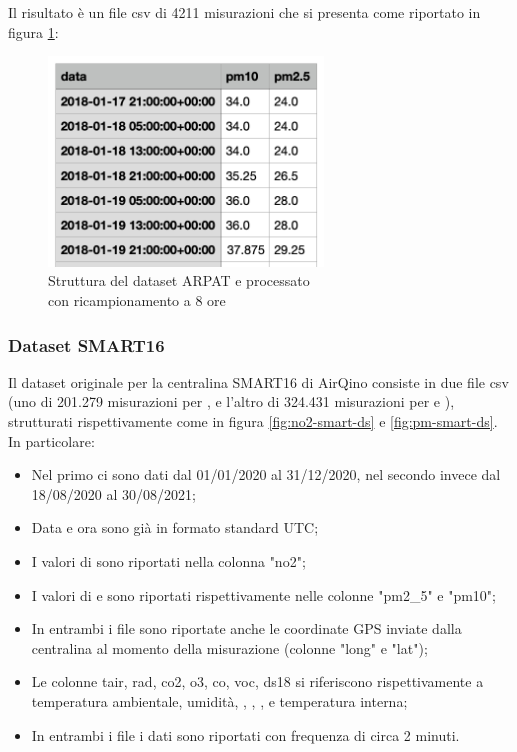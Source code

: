 Il risultato è un file csv di 4211 misurazioni che si presenta come riportato in figura \ref{fig:ds-arpat-pm-dopo}:

\begin{figure}[H]
\centering
\captionsetup{justification=centering}
\includegraphics[width=0.65\textwidth,height=\textheight,keepaspectratio]{img/dataset_arpat_pm_dopo.png}
\caption{Struttura del dataset ARPAT  e  processato\\con ricampionamento a 8 ore}
\label{fig:ds-arpat-pm-dopo}
\end{figure}


\subsubsection{Dataset SMART16}
Il dataset originale per la centralina SMART16 di AirQino consiste in due file csv (uno di 201.279 misurazioni per , e l'altro di 324.431 misurazioni per  e ), strutturati rispettivamente come in figura \ref{fig:no2-smart-ds} e \ref{fig:pm-smart-ds}. In particolare:

\begin{itemize}
  \item Nel primo ci sono dati dal 01/01/2020 al 31/12/2020, nel secondo invece dal 18/08/2020 al 30/08/2021;
  \item Data e ora sono già in formato standard UTC;
  \item I valori di  sono riportati nella colonna "no2";
  \item I valori di  e  sono riportati rispettivamente nelle colonne "pm2\_5" e "pm10";
  \item In entrambi i file sono riportate anche le coordinate GPS inviate dalla centralina al momento della misurazione (colonne "long" e "lat");
  \item Le colonne tair, rad, co2, o3, co, voc, ds18 si riferiscono rispettivamente a temperatura ambientale, umidità, , , ,  e temperatura interna;
  \item In entrambi i file i dati sono riportati con frequenza di circa 2 minuti.
\end{itemize}

